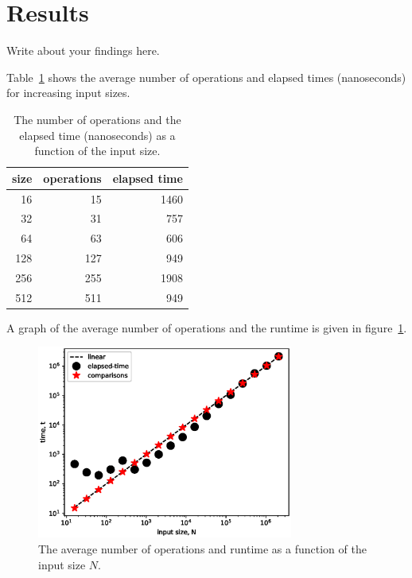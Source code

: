 \section{Results}
Write about your findings here.

Table~\ref{t:time} shows the average number of operations and elapsed
times (nanoseconds) for increasing input sizes.

\begin{table}[H]	%
	\centering	%
	\caption{
		The number of operations and the elapsed time (nanoseconds)
		as a function of the input size.
	}	%

	\begin{tabular}{r r r}
		size & operations & elapsed time \\
		\hline
		16 & 15 & 1460 \\
		32 & 31 &  757 \\
		64 & 63 &  606 \\
		128& 127&  949 \\
		256& 255& 1908 \\
		512& 511&  949
	\end{tabular}

	\label{t:time}
\end{table}


A graph of the average number of operations and the runtime is given in
figure~\ref{fig:best}.

\begin{figure}[H]
	\centering
	\includegraphics[keepaspectratio, width = 0.75\textwidth]{best.eps}
	\caption{
		The average number of operations and runtime as a
		function of the input size $N$.
	}
	\label{fig:best}
\end{figure}
